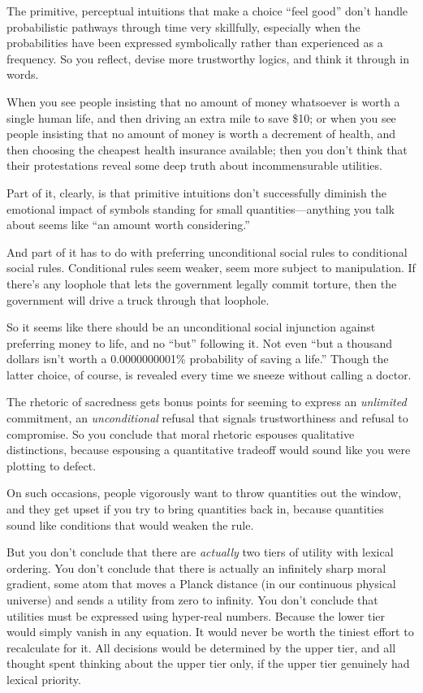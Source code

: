 {
 The primitive, perceptual intuitions that make a choice
``feel good'' don't
handle probabilistic pathways through time very skillfully, especially
when the probabilities have been expressed symbolically rather than
experienced as a frequency. So you reflect, devise more trustworthy
logics, and think it through in words.}

{
 When you see people insisting that no amount of money whatsoever
is worth a single human life, and then driving an extra mile to save
\$10; or when you see people insisting that no amount of money is worth
a decrement of health, and then choosing the cheapest health insurance
available; then you don't think that their
protestations reveal some deep truth about incommensurable utilities.}

{
 Part of it, clearly, is that primitive intuitions
don't successfully diminish the emotional impact of
symbols standing for small quantities---anything you talk about seems
like ``an amount worth
considering.''}

{
 And part of it has to do with preferring unconditional social
rules to conditional social rules. Conditional rules seem weaker, seem
more subject to manipulation. If there's any loophole
that lets the government legally commit torture, then the government
will drive a truck through that loophole.}

{
 So it seems like there should be an unconditional social
injunction against preferring money to life, and no
``but'' following it. Not even
``but a thousand dollars isn't worth a
0.0000000001\% probability of saving a life.'' Though
the latter choice, of course, is revealed every time we sneeze without
calling a doctor.}

{
 The rhetoric of sacredness gets bonus points for seeming to
express an \textit{unlimited} commitment, an \textit{unconditional}
refusal that signals trustworthiness and refusal to compromise. So you
conclude that moral rhetoric espouses qualitative distinctions, because
espousing a quantitative tradeoff would sound like you were plotting to
defect.}

{
 On such occasions, people vigorously want to throw quantities out
the window, and they get upset if you try to bring quantities back in,
because quantities sound like conditions that would weaken the rule.}

{
 But you don't conclude that there are
\textit{actually} two tiers of utility with lexical ordering. You
don't conclude that there is actually an infinitely
sharp moral gradient, some atom that moves a Planck distance (in our
continuous physical universe) and sends a utility from zero to
infinity. You don't conclude that utilities must be
expressed using hyper-real numbers. Because the lower tier would simply
vanish in any equation. It would never be worth the tiniest effort to
recalculate for it. All decisions would be determined by the upper
tier, and all thought spent thinking about the upper tier only, if the
upper tier genuinely had lexical priority.}

